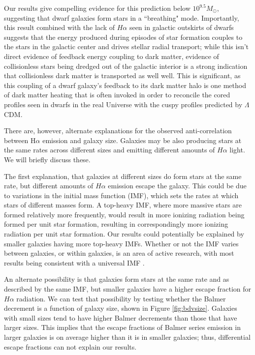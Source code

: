 \documentclass[iop]{emulateapj}
\begin{document}
Our results give compelling evidence for this prediction below $10^{9.5} M_{\odot}$, suggesting that dwarf galaxies form stars in a ``breathing" mode. Importantly, this result combined with the lack of $H\alpha$ seen in galactic outskirts of dwarfs suggests that the energy produced during episodes of star formation couples to the stars in the galactic center and drives stellar radial transport;  while this isn't direct evidence of feedback energy coupling to dark matter, evidence of collisionless stars being dredged out of the galactic interior is a strong indication that collisionless dark matter is transported as well well. This is significant, as this coupling of a dwarf galaxy's feedback to its dark matter halo is one method of dark matter heating that is often invoked in order to reconcile the cored profiles seen in dwarfs in the real Universe with the cuspy profiles predicted by $\Lambda$CDM. 

There are, however, alternate explanations for the observed anti-correlation between H$\alpha$ emission and galaxy size. Galaxies may be also producing stars at the same rates across different sizes and emitting different amounts of $H\alpha$ light. We will briefly discuss these.

The first explanation, that galaxies at different sizes do form stars at the same rate, but different amounts of $H\alpha$ emission escape the galaxy. This could be due to variations in the initial mass function (IMF), which sets the rates at which stars of different masses form. A top-heavy IMF, where more massive stars are formed relatively more frequently, would result in more ionizing radiation being formed per unit star formation, resulting in correspondingly more ionizing radiation per unit star formation. Our results could potentially be explained by smaller galaxies having more top-heavy IMFs. Whether or not the IMF varies between galaxies, or within galaxies, is an area of active research, with most results being consistent with a universal IMF \citep[e.g.,][]{Bastian10}. 

An alternate possibility is that galaxies form stars at the same rate and as described by the same IMF, but smaller galaxies have a higher escape fraction for $H\alpha$ radiation. We can test that possibility by testing whether the Balmer decrement is a function of galaxy size, shown in Figure \ref{fig:bdvsize}. Galaxies with small sizes tend to have higher Balmer decrements than those that have larger sizes. This implies that the escape fractions of Balmer series emission in larger galaxies is on average higher than it is in smaller galaxies; thus, differential escape fractions can not explain our results.
\end{document}
